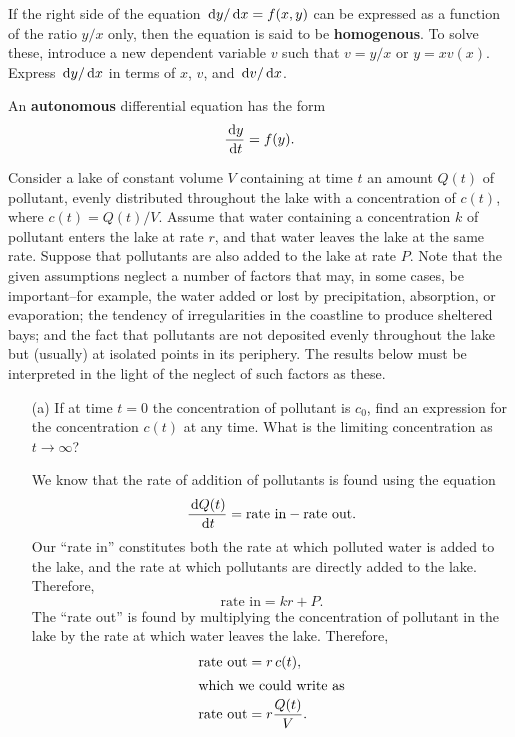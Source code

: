 If the right side of the equation $\,\mathrm{d} y/\,\mathrm{d} x=f(x,y)$ can be expressed as a function of the ratio $y/x$ only, then the equation is said to be \textbf{homogenous}.
To solve these, introduce a new dependent variable $v$ such that $v=y/x$ or $y=xv(x)$.
Express $\,\mathrm{d} y/\,\mathrm{d} x$ in terms of $x$, $v$, and $\,\mathrm{d} v/\,\mathrm{d} x$.

An \textbf{autonomous} differential equation has the form
\begin{equation}
  \frac{\,\mathrm{d} y}{\,\mathrm{d} t}=f(y).
  \label{eq:autode}
\end{equation}

\begin{ex}
    Consider a lake of constant volume $V$ containing at time $t$ an amount $Q(t)$ of pollutant,
    evenly distributed throughout the lake with a concentration of $c(t)$, where $c(t)=Q(t)/V$.
    Assume that water containing a concentration $k$ of pollutant enters the lake at rate $r$,
    and that water leaves the lake at the same rate.
    Suppose that pollutants are also added to the lake at rate $P$.
    Note that the given assumptions neglect a number of factors that may, in some cases, be important--for example,
    the water added or lost by precipitation, absorption, or evaporation;
    the tendency of irregularities in the coastline to produce sheltered bays;
    and the fact that pollutants are not deposited evenly throughout the lake but (usually) at isolated points in its periphery.
    The results below must be interpreted in the light of the neglect of such factors as these. \cite[p. 63]{boycede}
    \begin{enumerate}
      \item[(a)]
        If at time $t=0$ the concentration of pollutant is $c_0$, find an expression for the concentration $c(t)$ at any time.
        What is the limiting concentration as $t\to\infty$?
        \begin{sol}
          We know that the rate of addition of pollutants is found using the equation
          \begin{equation*}
            \frac{\,\mathrm{d} Q(t)}{\,\mathrm{d} t} = \text{rate in} - \text{rate out}.
          \end{equation*}
          Our ``rate in'' constitutes both the rate at which polluted water is added to the lake,
          and the rate at which pollutants are directly added to the lake.
          Therefore,
          \[ \text{rate in}=kr+P. \]
          The ``rate out'' is found by multiplying the concentration of pollutant in the lake by the rate at which water leaves the lake.
          Therefore,
          \begin{align*}
            \text{rate out} &=r\, c(t),\\
            \intertext{which we could write as}
            \text{rate out}&= r \frac{Q(t)}{V}.
          \end{align*}


\end{sol}
\end{enumerate}
\end{ex}
